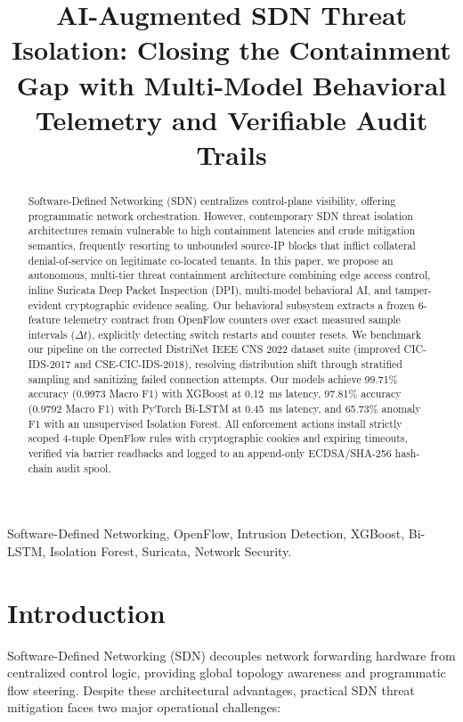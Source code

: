 \documentclass[conference]{IEEEtran}
\begin{document}
\title{AI-Augmented SDN Threat Isolation: Closing the Containment Gap with Multi-Model Behavioral Telemetry and Verifiable Audit Trails}

\maketitle

\begin{abstract}
Software-Defined Networking (SDN) centralizes control-plane visibility, offering programmatic network orchestration. However, contemporary SDN threat isolation architectures remain vulnerable to high containment latencies and crude mitigation semantics, frequently resorting to unbounded source-IP blocks that inflict collateral denial-of-service on legitimate co-located tenants. In this paper, we propose an autonomous, multi-tier threat containment architecture combining edge access control, inline Suricata Deep Packet Inspection (DPI), multi-model behavioral AI, and tamper-evident cryptographic evidence sealing. Our behavioral subsystem extracts a frozen 6-feature telemetry contract from OpenFlow counters over exact measured sample intervals ($\Delta t$), explicitly detecting switch restarts and counter resets. We benchmark our pipeline on the corrected DistriNet IEEE CNS 2022 dataset suite (improved CIC-IDS-2017 and CSE-CIC-IDS-2018), resolving distribution shift through stratified sampling and sanitizing failed connection attempts. Our models achieve 99.71\% accuracy (0.9973 Macro F1) with XGBoost at 0.12~ms latency, 97.81\% accuracy (0.9792 Macro F1) with PyTorch Bi-LSTM at 0.45~ms latency, and 65.73\% anomaly F1 with an unsupervised Isolation Forest. All enforcement actions install strictly scoped 4-tuple OpenFlow rules with cryptographic cookies and expiring timeouts, verified via barrier readbacks and logged to an append-only ECDSA/SHA-256 hash-chain audit spool.
\end{abstract}

\begin{IEEEkeywords}
Software-Defined Networking, OpenFlow, Intrusion Detection, XGBoost, Bi-LSTM, Isolation Forest, Suricata, Network Security.
\end{IEEEkeywords}

\section{Introduction}
Software-Defined Networking (SDN) decouples network forwarding hardware from centralized control logic, providing global topology awareness and programmatic flow steering. Despite these architectural advantages, practical SDN threat mitigation faces two major operational challenges:
\end{document}
